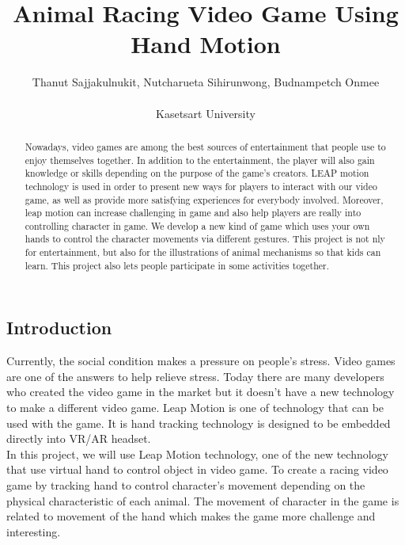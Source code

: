 \documentclass[12pt, oneside]{article}										%
\title{\textbf{Animal Racing Video Game Using Hand Motion}}
\author{Thanut Sajjakulnukit, Nutcharueta Sihirunwong, Budnampetch Onmee \\ \\
    \Large Kasetsart University }
\begin{document}
    \maketitle														        %
    \begin{multicols*}{2}
    \twocolumn
    \begin{abstract}                                                        %
        Nowadays, video games are among the best sources of 
        entertainment that people use to enjoy themselves together.
            In addition to the entertainment, the player will also gain 
            knowledge or skills depending on the purpose of the game’s 
            creators.   LEAP motion technology is used in order to 
            present new ways for players to interact with our video 
            game, as well as provide more satisfying experiences for 
            everybody involved. Moreover, leap motion can increase 
            challenging in game and also help players are really into 
            controlling character in game. We  develop a new kind of 
            game which uses your own hands to control the character 
            movements via different gestures. This project is not 
            nly for entertainment, but also for the illustrations 
            of animal mechanisms so that kids can learn. This 
            project also lets people participate in some 
            activities together.

    \end{abstract}

    \section{Introduction}                                                  %
    Currently, the social condition makes a pressure on people’s 
    stress. Video games are one of the answers to help relieve 
    stress. Today there are many developers who created the video 
    game in the market but it doesn't have a new technology to make 
    a different video game. Leap Motion is one of technology that 
    can be used with the game. It is hand tracking technology is 
    designed to be embedded directly into VR/AR headset. \\

    In this project, we will use Leap Motion technology, one of
    the new technology that use virtual hand to control object
    in video game. To create a racing video game by tracking 
    hand to control character’s movement depending on the 
    physical characteristic of each animal. The movement of 
    character in the game is related to movement of the hand 
    which makes the game more challenge and interesting.
    

\end{multicols*}
\end{document}
